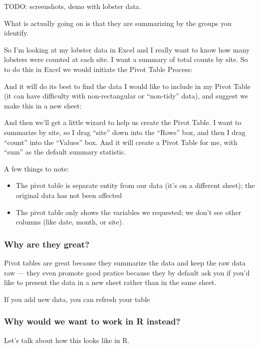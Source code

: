 \documentclass[]{book}
\providecommand{\tightlist}{%
  \setlength{\itemsep}{0pt}\setlength{\parskip}{0pt}}
\begin{document}
TODO: screenshots, demo with lobster data.

What is actually going on is that they are summarizing by the groups you identify.

So I'm looking at my lobster data in Excel and I really want to know how many lobsters were counted at each site. I want a summary of total counts by site. So to do this in Excel we would initiate the Pivot Table Process:

And it will do its best to find the data I would like to include in my Pivot Table (it can have difficulty with non-rectangular or ``non-tidy'' data), and suggest we make this in a new sheet:

And then we'll get a little wizard to help us create the Pivot Table. I want to summarize by site, so I drag ``site'' down into the ``Rows'' box, and then I drag ``count'' into the ``Values'' box. And it will create a Pivot Table for me, with ``sum'' as the default summary statistic.

A few things to note:

\begin{itemize}
\tightlist
\item
  The pivot table is separate entity from our data (it's on a different sheet); the original data has not been affected
\item
  The pivot table only shows the variables we requested; we don't see other columns (like date, month, or site).
\end{itemize}

\hypertarget{why-are-they-great}{%
\subsubsection{Why are they great?}\label{why-are-they-great}}

Pivot tables are great because they summarize the data and keep the raw data raw --- they even promote good pratice because they by default ask you if you'd like to present the data in a new sheet rather than in the same sheet.

If you add new data, you can refresh your table

\hypertarget{why-would-we-want-to-work-in-r-instead}{%
\subsubsection{Why would we want to work in R instead?}\label{why-would-we-want-to-work-in-r-instead}}

Let's talk about how this looks like in R.
\end{document}

